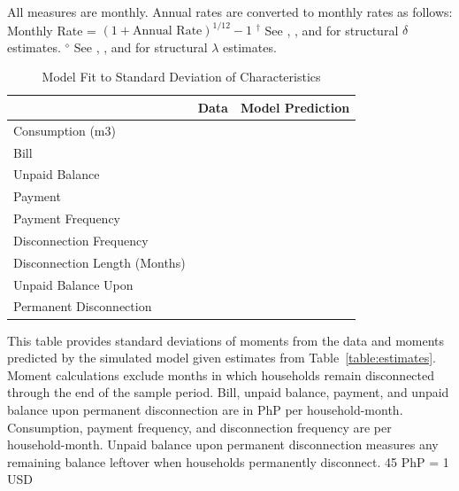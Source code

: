 \documentclass[12pt,table]{article}
\begin{document}
\begin{table}[H]
{\begin{threeparttable}
\begin{tabular}{l*{1}{lll}}
\end{tabular}
\begin{tablenotes}
\footnotesize
\item
All measures are monthly.  Annual rates are converted to monthly rates as follows: Monthly Rate = $(1+\text{Annual Rate})^{1/12}-1$ $\text{}^{\dagger}$ See \cite{andreoni2012estimating}, \cite{laibson2007estimating}, and \cite{gourinchas2002consumption} for structural $\delta$ estimates. $\text{}^{\diamond}$ See \cite{barseghyan2013nature}, \cite{beetsma2001measuring}, and \cite{carvalho2016effect} for structural $\lambda$ estimates. 
\end{tablenotes}
\end{threeparttable}
}
\end{table}


\begin{table}[H]
\centering
\caption{Model Fit to Standard Deviation of Characteristics}\label{table:fitsd}
\begin{threeparttable}
\begin{tabular}{@{}l*{1}{KK}@{}}
\toprule
 & Data & Model Prediction \\
\midrule
Consumption (m3) &  &   \\
Bill &   &   \\
Unpaid Balance &    &    \\
Payment &   &   \\
Payment Frequency &   &    \\
Disconnection Frequency &    &   \\
Disconnection Length (Months) &  &   \\
Unpaid Balance Upon &   &    \\[-.5em]
Permanent Disconnection \\
\bottomrule
\end{tabular}
\begin{tablenotes}
\item 
\footnotesize
This table provides standard deviations of moments from the data and moments predicted by the simulated model given estimates from Table~\ref{table:estimates}.  Moment calculations exclude months in which households remain disconnected through the end of the sample period.  Bill, unpaid balance, payment, and unpaid balance upon permanent disconnection are in PhP per household-month.  Consumption, payment frequency, and disconnection frequency are per household-month.  Unpaid balance upon permanent disconnection measures any remaining balance leftover when households permanently disconnect.    45 PhP = 1 USD
\end{tablenotes}
\end{threeparttable}


\end{table}
\end{document}
